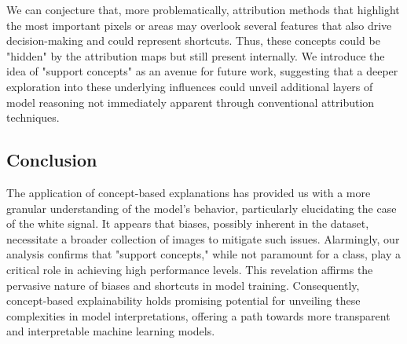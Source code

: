 We can conjecture that, more problematically, attribution methods that highlight the most important pixels or areas may overlook several features that also drive decision-making and could represent shortcuts. Thus, these concepts could be "hidden" by the attribution maps but still present internally. We introduce the idea of "support concepts" as an avenue for future work, suggesting that a deeper exploration into these underlying influences could unveil additional layers of model reasoning not immediately apparent through conventional attribution techniques.

\subsection{Conclusion}

The application of concept-based explanations has provided us with a more granular understanding of the model's behavior, particularly elucidating the case of the white signal. It appears that biases, possibly inherent in the dataset, necessitate a broader collection of images to mitigate such issues. Alarmingly, our analysis confirms that "support concepts," while not paramount for a class, play a critical role in achieving high performance levels. This revelation affirms the pervasive nature of biases and shortcuts in model training. Consequently, concept-based explainability holds promising potential for unveiling these complexities in model interpretations, offering a path towards more transparent and interpretable machine learning models.
